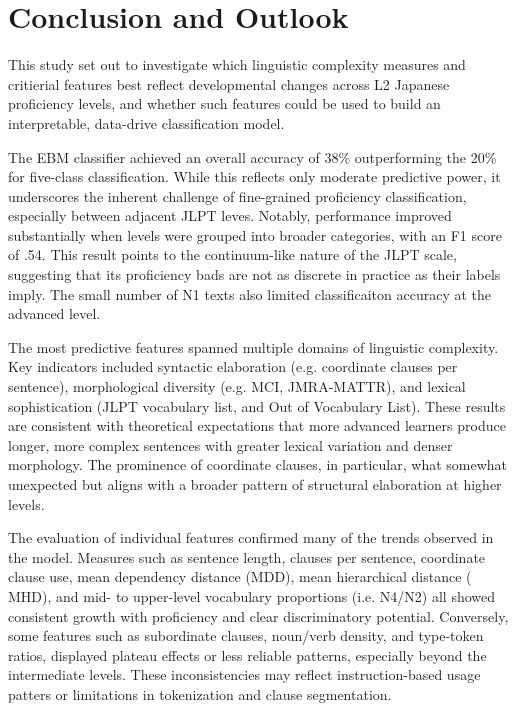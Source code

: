 \chapter{Conclusion and Outlook}
This study set out to investigate which linguistic complexity measures and critierial features best reflect
developmental changes across L2 Japanese proficiency levels, and whether such features could be used to build an
interpretable, data-drive classification model.



The EBM classifier achieved an overall accuracy of 38\% outperforming the 20\% for five-class classification. While
this reflects only moderate predictive power, it underscores the inherent challenge of fine-grained proficiency
classification, especially between adjacent JLPT leves. Notably, performance improved substantially when levels were
grouped into broader categories, with an F1 score of .54. This result points to the continuum-like nature of the
JLPT scale, suggesting that its proficiency bads are not as discrete in practice as their labels imply. The small
number of N1 texts also limited classificaiton accuracy at the advanced level.

The most predictive features spanned multiple domains of linguistic complexity. Key indicators included syntactic
elaboration (e.g. coordinate clauses per sentence), morphological diversity (e.g. MCI, JMRA-MATTR), and lexical
sophistication (JLPT vocabulary list, and Out of Vocabulary List). These results are consistent with theoretical
expectations that more advanced learners produce longer, more complex sentences with greater lexical variation and
denser morphology. The prominence of coordinate clauses, in particular, what somewhat unexpected but aligns with a
broader pattern of structural elaboration at higher levels.

The evaluation of individual features confirmed many of the trends observed in the model. Measures such as sentence
length, clauses per sentence, coordinate clause use, mean dependency distance (MDD), mean hierarchical distance (
MHD), and mid- to upper-level vocabulary proportions (i.e. N4/N2) all showed consistent growth with proficiency and
clear discriminatory potential. Conversely, some features such as subordinate clauses, noun/verb density, and
type-token ratios, displayed plateau effects or less reliable patterns, especially beyond the intermediate levels.
These inconsistencies may reflect instruction-based usage patters or limitations in tokenization and clause
segmentation.

